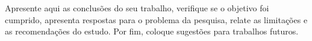 Apresente aqui as conclusões do seu trabalho, verifique se o objetivo foi cumprido, apresenta respostas para o problema da pesquisa, relate as limitações e as recomendações do estudo. Por fim, coloque sugestões para trabalhos futuros.